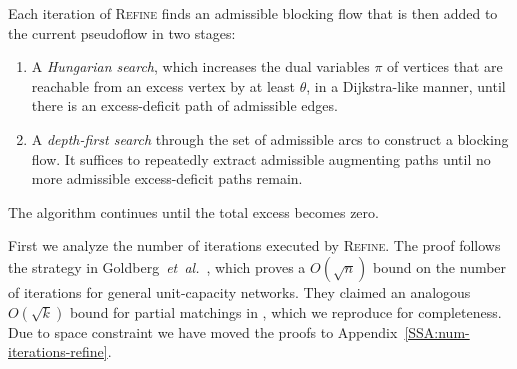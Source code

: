 \documentclass[a4paper,UKenglish]{socg-lipics-v2018}
\makeatletter
\def\etal{\emph{et~al.}}
\def\etal{\textit{et~al.}}
\def\eps{\varepsilon}
\theoremstyle{plain}
\numberwithin{figure}{section}
\def\EMPH#1{\textcolor{BrickRed}{{\emph{#1}}}}
\def\n@te#1{\textsf{\boldmath \textbf{$\langle\!\langle$#1$\rangle\!\rangle$}}\leavevmode}
\def\note#1{\textcolor{red}{\n@te{#1}}}
\makeatother
\begin{document}
Each iteration of \textsc{Refine} finds an admissible blocking flow that is then added to the current pseudoflow in two stages:
\begin{enumerate}
\item
A \EMPH{Hungarian search}, which increases the dual variables $\pi$ of vertices that are reachable from an excess vertex by at least $\theta$, in a Dijkstra-like manner, until there is an excess-deficit path of admissible edges.
\item
A \EMPH{depth-first search} through the set of admissible arcs to construct a blocking flow.
It suffices to repeatedly extract admissible augmenting paths until no more admissible excess-deficit paths remain.
\end{enumerate}
The algorithm continues until the total excess becomes zero.

First we analyze the number of iterations executed by \textsc{Refine}.
The proof follows the strategy in Goldberg~\etal~\cite[Section~3.2]{GHKT17},
which proves a $O(\sqrt{n})$ bound on the number of iterations for general
unit-capacity networks.
They claimed an analogous $O(\sqrt{k})$ bound for partial matchings in
\cite[Section~6.1]{GHKT17}, which we reproduce for completeness.
Due to space constraint we have moved the proofs to Appendix~\ref{SSA:num-iterations-refine}.
\end{document}
